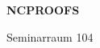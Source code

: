 \documentclass[a4paper]{article}
\begin{document}
\printGenericVSLHeader
\begin{center}
\begin{vsltext}{3cm}{4cm}

   \vspace{0.5cm} 

    \textbf{NCPROOFS} 

    \vspace{1.5cm}

    Seminarraum 104

\end{vsltext}

\end{center}
\end{document}
